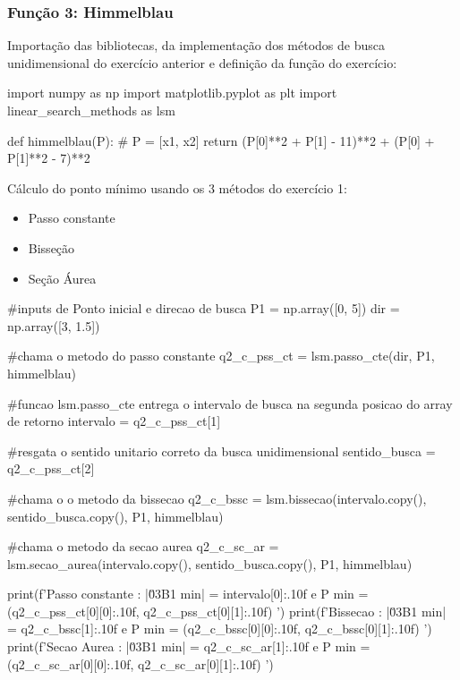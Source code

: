 \documentclass[10pt, a4paper]{article}
\begin{document}



\subsubsection{Função 3: Himmelblau}

Importação das bibliotecas, da implementação dos métodos de busca unidimensional do exercício anterior e
definição da função do exercício:

\begin{python}
  import numpy as np
  import matplotlib.pyplot as plt
  import linear_search_methods as lsm

  def himmelblau(P):
    # P = [x1, x2]
    return (P[0]**2 + P[1] - 11)**2 + (P[0] + P[1]**2 - 7)**2
\end{python}

  Cálculo do ponto mínimo usando os 3 métodos do exercício 1:

\begin{itemize}
  \item Passo constante
  \item Bisseção
  \item Seção Áurea
\end{itemize}

\begin{python}

  #inputs de Ponto inicial e direcao de busca
  P1 = np.array([0, 5])
  dir = np.array([3, 1.5])

  #chama o metodo do passo constante
  q2_c_pss_ct = lsm.passo_cte(dir, P1, himmelblau)

  #funcao lsm.passo_cte entrega o intervalo de busca na segunda posicao do array de retorno
  intervalo = q2_c_pss_ct[1]

  #resgata o sentido unitario correto da busca unidimensional
  sentido_busca = q2_c_pss_ct[2]

  #chama o o metodo da bissecao
  q2_c_bssc = lsm.bissecao(intervalo.copy(), sentido_busca.copy(), P1, himmelblau)

  #chama o metodo da secao aurea
  q2_c_sc_ar = lsm.secao_aurea(intervalo.copy(), sentido_busca.copy(), P1, himmelblau)

  print(f'Passo constante : |\u03B1 min| = {intervalo[0]:.10f} e P min = ({q2_c_pss_ct[0][0]:.10f}, {q2_c_pss_ct[0][1]:.10f}) ')
  print(f'Bissecao        : |\u03B1 min| = {q2_c_bssc[1]:.10f} e P min = ({q2_c_bssc[0][0]:.10f}, {q2_c_bssc[0][1]:.10f}) ')
  print(f'Secao Aurea     : |\u03B1 min| = {q2_c_sc_ar[1]:.10f} e P min = ({q2_c_sc_ar[0][0]:.10f}, {q2_c_sc_ar[0][1]:.10f}) ')

\end{python}
\end{document}
